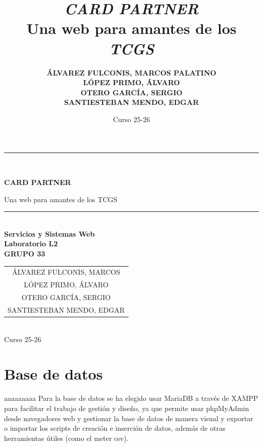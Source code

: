 \documentclass[10pt]{article}
\title{\textit{CARD PARTNER}\\ Una web para amantes de los \textit{TCGS}}
\author{
	\textbf{\small ÁLVAREZ FULCONIS, MARCOS PALATINO}\\
	\textbf{\small LÓPEZ PRIMO, ÁLVARO}\\
	\textbf{\small OTERO GARCÍA, SERGIO}\\
	\textbf{\small SANTIESTEBAN MENDO, EDGAR}
}
\date{Curso 25-26}
\begin{document}
	
	\begin{titlepage}
		\centering
		\rule{\linewidth}{0.2mm}\\[0.4cm]
		{\huge\bfseries CARD PARTNER\par}
		{\large Una web para amantes de los TCGS\par}
		\rule{\linewidth}{0.2mm}\\[1.5cm]
		{\Large\bfseries Servicios y Sistemas Web}\\[0.3cm]
		{\large\bfseries Laboratorio L2 \\ GRUPO 33}\\[1cm]
		{\Large \begin{tabular}{c} ÁLVAREZ FULCONIS, MARCOS \\ LÓPEZ PRIMO, ÁLVARO \\ OTERO GARCÍA, SERGIO \\ SANTIESTEBAN MENDO, EDGAR \end{tabular}}\\[1.5cm]
		{\Large Curso 25-26}
	\end{titlepage}
	
	\tableofcontents \newpage
	
	\setcounter{page}{1}
	
	\section{Base de datos}
	aaaaaaaaa
		Para la base de datos se ha elegido usar MariaDB a través de XAMPP para facilitar el trabajo de gestión y diseño, ya que permite usar phpMyAdmin desde navegadores web y gestionar la base de datos de manera visual y exportar o importar los scripts de creación e inserción de datos,  además de otras herramientas útiles (como el meter csv).
\end{document}
